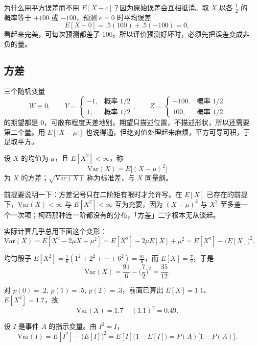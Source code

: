 为什么用平方误差而不用 $E[X-c]$？因为原始误差会互相抵消。取 $X$ 以各 $\frac12$ 的概率等于 $+100$ 或 $-100$，预测 $c=0$ 时平均误差
\[
E[X-0]=.5(100)+.5(-100)=0,
\]
看起来完美，可每次预测都差了 $100$。所以评价预测好坏时，必须先把误差变成非负的量。

\subsection{方差}

三个随机变量
\[
W\equiv 0,\qquad
Y=\begin{cases}-1, & \text{概率 }1/2\\ 1, & \text{概率 }1/2\end{cases},\qquad
Z=\begin{cases}-100, & \text{概率 }1/2\\ 100, & \text{概率 }1/2\end{cases}
\]
的期望都是 $0$，可散布程度天差地别。期望只描述位置，不描述形状，所以还需要第二个量。用 $E[|X-\mu|]$ 也说得通，但绝对值处理起来麻烦，平方可导可积，于是取平方。

\begin{definition}[方差与标准差]
设 $X$ 的均值为 $\mu$，且 $E[X^2]<\infty$，称
\[
\mathrm{Var}(X)=E\big[(X-\mu)^2\big]
\]
为 $X$ 的方差；$\sqrt{\mathrm{Var}(X)}$ 称为标准差，与 $X$ 同量纲。
\end{definition}

前提要说明一下：方差记号只在二阶矩有限时才允许写。在 $E[X]$ 已存在的前提下，$\mathrm{Var}(X)<\infty$ 与 $E[X^2]<\infty$ 互为充要，因为 $(X-\mu)^2$ 与 $X^2$ 至多差一个一次项；柯西那种连一阶都没有的分布，「方差」二字根本无从谈起。

实际计算几乎总用下面这个变形：
\[
\mathrm{Var}(X)=E[X^2-2\mu X+\mu^2]=E[X^2]-2\mu E[X]+\mu^2=E[X^2]-\big(E[X]\big)^2 .
\]

\begin{example}[掷骰子]
均匀骰子 $E[X^2]=\frac16(1^2+2^2+\cdots+6^2)=\frac{91}{6}$，而 $E[X]=\frac72$，于是
\[
\mathrm{Var}(X)=\frac{91}{6}-\Big(\frac72\Big)^2=\frac{35}{12}.
\]
\end{example}

\begin{example}
对 $p(0)=.2,\ p(1)=.5,\ p(2)=.3$，前面已算出 $E[X]=1.1$、$E[X^2]=1.7$，故
\[
\mathrm{Var}(X)=1.7-(1.1)^2=0.49 .
\]
\end{example}

\begin{example}[指示变量的方差]
设 $I$ 是事件 $A$ 的指示变量。由 $I^2=I$，
\[
\mathrm{Var}(I)=E[I^2]-\big(E[I]\big)^2=E[I]\big(1-E[I]\big)=P(A)\big[1-P(A)\big].
\]
\end{example}

